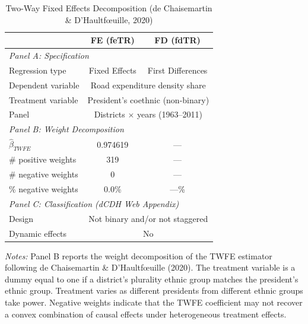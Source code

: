 \begin{table}[htbp]
\centering
\caption{Two-Way Fixed Effects Decomposition (de Chaisemartin \& D'Haultf\oe uille, 2020)}
\label{tab:burgess_twfe}
\begin{tabular}{lcc}
\toprule
 & FE (feTR) & FD (fdTR) \\
\midrule
\multicolumn{3}{l}{\textit{Panel A: Specification}} \\[3pt]
Regression type & Fixed Effects & First Differences \\
Dependent variable & \multicolumn{2}{c}{Road expenditure density share} \\
Treatment variable & \multicolumn{2}{c}{President's coethnic (non-binary)} \\
Panel & \multicolumn{2}{c}{Districts $\times$ years (1963--2011)} \\[6pt]
\multicolumn{3}{l}{\textit{Panel B: Weight Decomposition}} \\[3pt]
$\hat{\beta}_{TWFE}$ & 0.974619 & --- \\
\# positive weights & 319 & --- \\
\# negative weights & 0 & --- \\
\% negative weights &   0.0\% & ---\% \\[6pt]
\multicolumn{3}{l}{\textit{Panel C: Classification (dCDH Web Appendix)}} \\[3pt]
Design & \multicolumn{2}{c}{Not binary and/or not staggered} \\
Dynamic effects & \multicolumn{2}{c}{No} \\
\bottomrule
\end{tabular}

\vspace{6pt}
\begin{minipage}{0.92\textwidth}
\footnotesize
\textit{Notes:} Panel B reports the weight decomposition of the TWFE estimator 
following de Chaisemartin \& D'Haultf\oe uille (2020). 
The treatment variable is a dummy equal to one if a district's plurality 
ethnic group matches the president's ethnic group. Treatment varies as 
different presidents from different ethnic groups take power. 
Negative weights indicate that the TWFE coefficient may not recover 
a convex combination of causal effects under heterogeneous treatment effects.
\end{minipage}
\end{table}
